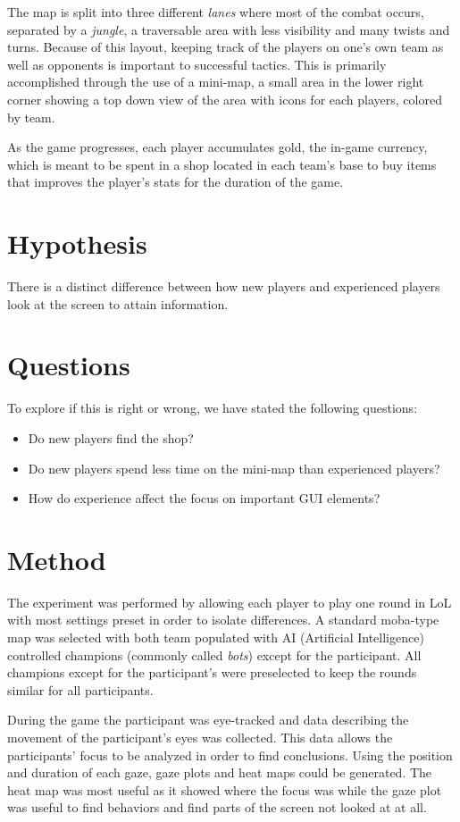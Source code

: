 \documentclass{report}
\begin{document}
The map is split into three different \emph{lanes} where most of the combat occurs, separated by a \emph{jungle}, a traversable area with less visibility and many twists and turns. Because of this layout, keeping track of the players on one's own team as well as opponents is important to successful tactics. This is primarily accomplished through the use of a mini-map, a small area in the lower right corner showing a top down view of the area with icons for each players, colored by team.

As the game progresses, each player accumulates gold, the in-game currency, which is meant to be spent in a shop located in each team's base to buy items that improves the player's stats for the duration of the game.

\section{Hypothesis}
There is a distinct difference between how new players and experienced players look at the screen to attain information.

\section{Questions}
To explore if this is right or wrong, we have stated the following questions:

\begin{itemize}
\item Do new players find the shop?
\item Do new players spend less time on the mini-map than experienced players?
\item How do experience affect the focus on important GUI elements?
\end{itemize}

\section{Method}
The experiment was performed by allowing each player to play one round in LoL with most settings preset in order to isolate differences. A standard moba-type map was selected with both team populated with AI (Artificial Intelligence) controlled champions (commonly called \emph{bots}) except for the participant. All champions except for the participant's were preselected to keep the rounds similar for all participants.

During the game the participant was eye-tracked and data describing the movement of the participant's eyes was collected. This data allows the participants’ focus to be analyzed in order to find conclusions. Using the position and duration of each gaze, gaze plots and heat maps could be generated. The heat map was most useful as it showed where the focus was while the gaze plot was useful to find behaviors and find parts of the screen not looked at at all.
\end{document}
